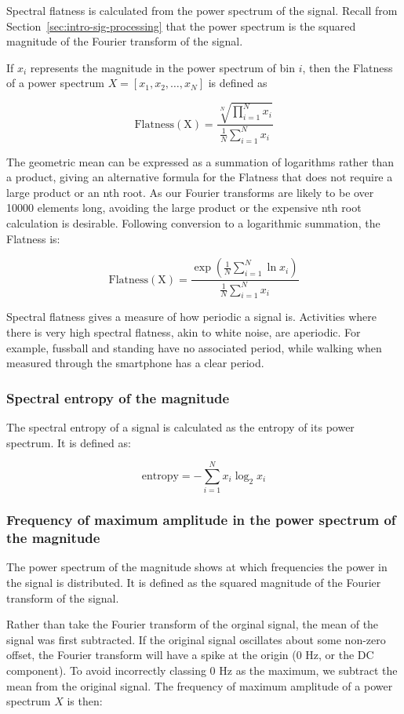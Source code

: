         Spectral flatness is calculated from the power spectrum of the signal. Recall from Section~\ref{sec:intro-sig-processing} that the power spectrum is the squared magnitude of the Fourier transform of the signal.
        
        If $x_i$ represents the magnitude in the power spectrum of bin $i$, then the Flatness of a power spectrum $X = [x_1, x_2, \dots , x_N]$ is defined as
        
        $$\mathrm{Flatness(X)} = \frac{\sqrt[N]{\prod\limits_{i=1}^N x_i}}{\frac{1}{N}\sum_{i=1}^N x_i}$$
        
        The geometric mean can be expressed as a summation of logarithms rather than a product, giving an alternative formula for the Flatness that does not require a large product or an nth root. As our Fourier transforms are likely to be over 10000 elements long, avoiding the large product or the expensive nth root calculation is desirable. Following conversion to a logarithmic summation, the Flatness is:
        
        $$\mathrm{Flatness(X)} = \frac{\exp \left( \frac{1}{N}\sum\limits_{i=1}^N \ln x_i \right) }{\frac{1}{N}\sum_{i=1}^N x_i}$$
        
        Spectral flatness gives a measure of how periodic a signal is. Activities where there is very high spectral flatness, akin to white noise, are aperiodic. For example, fussball and standing have no associated period, while walking when measured through the smartphone has a clear period.
      \subsubsection{Spectral entropy of the magnitude}
        The spectral entropy of a signal is calculated as the entropy of its power spectrum. It is defined as:

        $$\mathrm{entropy} = -\sum\limits_{i=1}^N x_i \log_2 x_i$$
      \subsubsection{Frequency of maximum amplitude in the power spectrum of the magnitude}
        The power spectrum of the magnitude shows at which frequencies the power in the signal is distributed. It is defined as the squared magnitude of the Fourier transform of the signal.
        
        Rather than take the Fourier transform of the orginal signal, the mean of the signal was first subtracted. If the original signal oscillates about some non-zero offset, the Fourier transform will have a spike at the origin (0 \si{Hz}, or the DC component). To avoid incorrectly classing 0 \si{Hz} as the maximum, we subtract the mean from the original signal. The frequency of maximum amplitude of a power spectrum $X$ is then:
        
